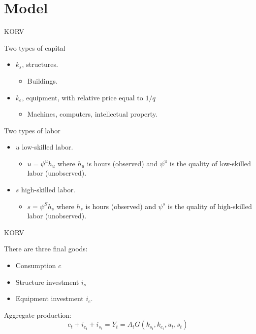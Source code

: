 \documentclass[notes,11pt, aspectratio=169]{beamer}
\newenvironment{wideitemize}{\itemize\addtolength{\itemsep}{10pt}}{\enditemize}
\begin{document}
\section{Model}
\begin{frame}{KORV}
    \begin{wideitemize}
    \item Two types of capital
    \begin{itemize}
        \item $k_s$, structures.
        \begin{itemize}
            \item Buildings.
        \end{itemize}
        \item $k_e$, equipment, with relative price equal to $1/q$
        \begin{itemize}
            \item Machines, computers, intellectual property.
        \end{itemize}
    \end{itemize}
    \item Two types of labor
        \begin{itemize}
            \item $u$ low-skilled labor.
              \begin{itemize}
                \item $u= \psi^u h_u$ where $h_u$ is hours (observed) and $\psi^u$ is the quality of low-skilled labor (unobserved). 
            \end{itemize}
            \item $s$ high-skilled labor.
            \begin{itemize}
                \item $s = \psi^S h_s$ where $h_s$ is hours (observed) and $\psi^s$ is the quality of high-skilled labor (unobserved). 
            \end{itemize}
        \end{itemize}
\end{wideitemize}
\end{frame}

\begin{frame}{KORV}
    \begin{wideitemize}
    \item There are three final goods:
    \begin{itemize}
        \item Consumption $c$
        \item Structure investment $i_s$
        \item Equipment investment $i_e$.
    \end{itemize}
    \item Aggregate production:
    \begin{equation}\label{eq:production}
      c_t + i_{e_t} + i_{s_t} = Y_t = A_t G(k_{s_t}, k_{e_t}, u_t, s_t)
    \end{equation}
    \end{wideitemize}
\end{frame}
\end{document}
